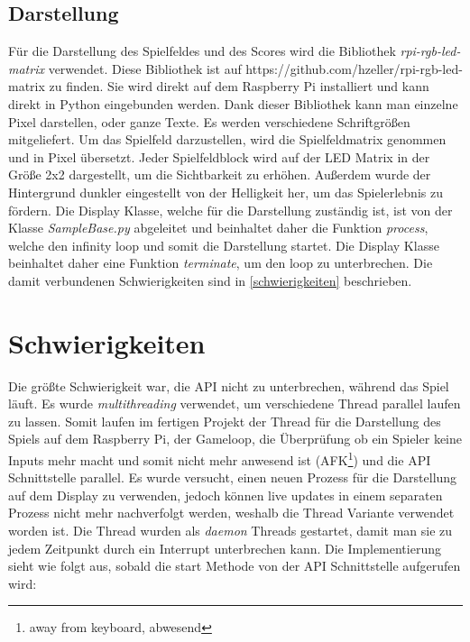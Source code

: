 \documentclass[a4paper,12pt]{scrartcl}
\begin{document}

\subsection{Darstellung}

Für die Darstellung des Spielfeldes und des Scores wird die Bibliothek \textit{rpi-rgb-led-matrix} verwendet. Diese Bibliothek ist auf https://github.com/hzeller/rpi-rgb-led-matrix zu finden. Sie wird direkt auf dem Raspberry Pi installiert und kann direkt in Python eingebunden werden. Dank dieser Bibliothek kann man einzelne Pixel darstellen, oder ganze Texte. Es werden verschiedene Schriftgrößen mitgeliefert. Um das Spielfeld darzustellen, wird die Spielfeldmatrix genommen und in Pixel übersetzt. Jeder Spielfeldblock wird auf der LED Matrix in der Größe 2x2 dargestellt, um die Sichtbarkeit zu erhöhen. Außerdem wurde der Hintergrund dunkler eingestellt von der Helligkeit her, um das Spielerlebnis zu fördern. Die Display Klasse, welche für die Darstellung zuständig ist, ist von der Klasse \textit{SampleBase.py} abgeleitet und beinhaltet daher die Funktion \textit{process}, welche den infinity loop und somit die Darstellung startet. Die Display Klasse beinhaltet daher eine Funktion \textit{terminate}, um den loop zu unterbrechen. Die damit verbundenen Schwierigkeiten sind in \autoref{schwierigkeiten} beschrieben.


\label{schwierigkeiten} %
\section{Schwierigkeiten}

Die größte Schwierigkeit war, die API nicht zu unterbrechen, während das Spiel läuft. Es wurde \textit{multithreading} verwendet, um verschiedene Thread parallel laufen zu lassen. Somit laufen im fertigen Projekt der Thread für die Darstellung des Spiels auf dem Raspberry Pi, der Gameloop, die Überprüfung ob ein Spieler keine Inputs mehr macht und somit nicht mehr anwesend ist (AFK\footnote{away from keyboard, abwesend}) und die API Schnittstelle parallel. Es wurde versucht, einen neuen Prozess für die Darstellung auf dem Display zu verwenden, jedoch können live updates in einem separaten Prozess nicht mehr nachverfolgt werden, weshalb die Thread Variante verwendet worden ist. Die Thread wurden als \textit{daemon} Threads gestartet, damit man sie zu jedem Zeitpunkt durch ein Interrupt unterbrechen kann. Die Implementierung sieht wie folgt aus, sobald die start Methode von der API Schnittstelle aufgerufen wird:
\end{document}
